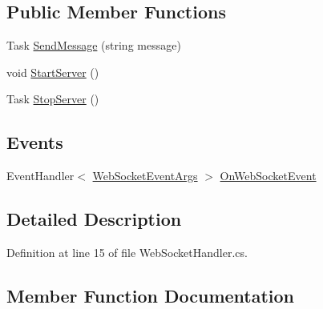 \subsection*{Public Member Functions}
\begin{DoxyCompactItemize}
\item 
Task \mbox{\hyperlink{interface_little_weeb_library_1_1_handlers_1_1_i_web_socket_handler_a1e512d10e0dd5f5b15abc2b46659142a}{Send\+Message}} (string message)
\item 
void \mbox{\hyperlink{interface_little_weeb_library_1_1_handlers_1_1_i_web_socket_handler_a14d51d50fb03c21d6f47f4250e49f288}{Start\+Server}} ()
\item 
Task \mbox{\hyperlink{interface_little_weeb_library_1_1_handlers_1_1_i_web_socket_handler_a69aca27030b0df701d7ce57ba2545cb1}{Stop\+Server}} ()
\end{DoxyCompactItemize}
\subsection*{Events}
\begin{DoxyCompactItemize}
\item 
Event\+Handler$<$ \mbox{\hyperlink{class_little_weeb_library_1_1_event_arguments_1_1_web_socket_event_args}{Web\+Socket\+Event\+Args}} $>$ \mbox{\hyperlink{interface_little_weeb_library_1_1_handlers_1_1_i_web_socket_handler_a97a64552bc41c6a11c65ec489f833d8c}{On\+Web\+Socket\+Event}}
\end{DoxyCompactItemize}


\subsection{Detailed Description}


Definition at line 15 of file Web\+Socket\+Handler.\+cs.



\subsection{Member Function Documentation}
\mbox{\label{interface_little_weeb_library_1_1_handlers_1_1_i_web_socket_handler_a1e512d10e0dd5f5b15abc2b46659142a}} 
